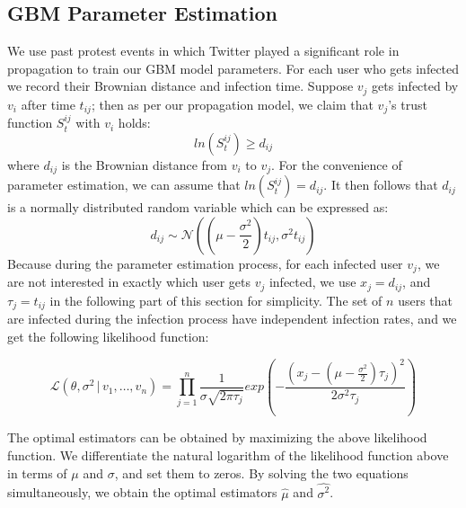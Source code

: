 \subsection{GBM Parameter Estimation}
We use past protest events in which Twitter played a significant role in propagation to train
our GBM model parameters. For each user who gets infected we record their Brownian distance and infection time. Suppose $v_j$ gets infected by $v_i$ after time $t_{ij}$; then as per our propagation model, we claim that $v_j$'s trust function $S_t^{ij}$ with $v_i$ holds:
\begin{equation}
ln(S_t^{ij}) \geq d_{ij}
\end{equation}
where $d_{ij}$ is the Brownian distance from $v_i$ to $v_j$. For the convenience of parameter estimation, we can assume that $ln(S_t^{ij}) = d_{ij}$. It
then follows that $d_{ij}$ is a normally distributed random variable which can be expressed as:
\begin{equation}
d_{ij}\sim \mathcal{N}((\mu - \frac{\sigma^2}{2})t_{ij}, \sigma ^{2}t_{ij})
\end{equation}
Because during the parameter estimation process, for each infected user $v_j$, we are not interested in exactly which
user gets $v_j$ infected, we use $x_j = d_{ij}$, and $\tau_j = t_{ij}$ in the following part of this section for simplicity. The set of $n$ users that are infected during the infection process have independent infection rates, and we get the following likelihood function:

\begin{equation*}
{\mathcal  {L}}(\theta, \sigma^2 \,|\,v_{1},\ldots ,v_{n})=\prod _{{j=1}}^{n}\frac{1}{\sigma\sqrt{2\pi \tau_j}}exp(-\frac{(x_j-(\mu-\frac{\sigma^2}{2})\tau_j)^2}{2\sigma^2\tau_j})
\end{equation*}

The optimal estimators can be obtained by maximizing the above likelihood function.
We differentiate the natural logarithm of the likelihood function above in terms of $\mu$ and $\sigma$, and set them to zeros. By solving the
two equations simultaneously, we obtain the optimal estimators $\hat{\mu}$ and $\hat{\sigma^2}$.

%
%

